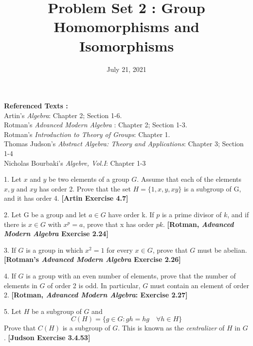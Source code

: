 \documentclass{article}
\title{Problem Set 2 : Group Homomorphisms and Isomorphisms}
\date{July 21, 2021}
\begin{document}
\maketitle
\noindent
\textbf{Referenced Texts :} \\
Artin's \textit{Algebra}: Chapter 2; Section 1-6. \\
Rotman's \textit{Advanced Modern Algebra} : Chapter 2; Section 1-3.\\
Rotman's \textit{Introduction to Theory of Groups}: Chapter 1. \\
Thomas Judson's \textit{Abstract Algebra: Theory and Applications}: Chapter 3; Section 1-4 \\
Nicholas Bourbaki's \textit{Algebre, Vol.I}: Chapter 1-3
	
	\vspace{5mm}

\par 
1. Let $x$ and $y$ be two elements of a group $G$. Assume that each of the elements $x,y$ and $xy$ has order 2. Prove that the set $H = \{1,x,y,xy\}$ is a subgroup of G, and it has order 4. \textbf{[Artin Exercise 4.7]}

\vspace{2.5mm}
\noindent

2. Let G be a group and let $a \in G$ have order k. If $p$ is a prime divisor of $k$, and if there is $x \in G$ with $x^{p} = a$, prove that x has order $pk$. \textbf{[Rotman, \textit{Advanced Modern Algebra} Exercise 2.24]}

\vspace{2.5mm}
\noindent

3. If $G$ is a group in which $x^{2}=1$ for every $x \in G$, prove that $G$ must be abelian. \textbf{[Rotman's \textit{Advanced Modern Algebra} Exercise 2.26]}

\vspace{2.5mm}
\noindent

4. If $G$ is a group with an even number of elements, prove that the number of elements in $G$ of order 2 is odd. In particular, $G$ must contain an element of order 2. \textbf{[Rotman, \textit{Advanced Modern Algebra}:  Exercise 2.27]}

\vspace{2.5mm}
\noindent

5. Let $H$ be a subgroup of $G$ and 
\[ C(H) = \{ g \in G : gh = hg \quad \forall h \in H \} \] 
Prove that $C(H)$ is a subgroup of $G$. This is known as the \textit{centralizer} of $H$ in $G$. \textbf{[Judson Exercise 3.4.53]}
\end{document}
